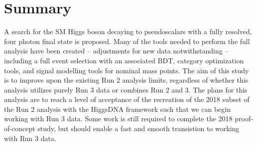 \documentclass[12pt]{article}
\begin{document}
\section{Summary}
A search for the SM Higgs boson decaying to pseudoscalars with a fully resolved, four photon final state is proposed. Many of the tools needed to perform the full analysis have been created -- adjustments for new data notwithstanding -- including a full event selection with an associated BDT, category optimization tools, and signal modelling tools for nominal mass points. The aim of this study is to improve upon the existing Run 2 analysis limits, regardless of whether this analysis utilizes purely Run 3 data or combines Run 2 and 3. The plans for this analysis are to reach a level of acceptance of the recreation of the 2018 subset of the Run 2 analysis with the HiggsDNA framework such that we can begin working with Run 3 data. Some work is still required to complete the 2018 proof-of-concept study, but should enable a fast and smooth transistion to working with Run 3 data.\par

\newpage
\printbibliography
\end{document}
